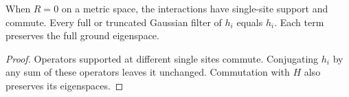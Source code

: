 \begin{lemma}
    \label{lem:hastings05_zero_range}
    \leanok
    When $R=0$ on a metric space, the interactions have single-site
    support and commute. Every full or truncated Gaussian filter of
    $h_i$ equals $h_i$. Each term preserves the full ground eigenspace.
\end{lemma}
\begin{proof}\leanok
    Operators supported at different single sites commute. Conjugating
    $h_i$ by any sum of these operators leaves it unchanged. Commutation
    with $H$ also preserves its eigenspaces.
\end{proof}
